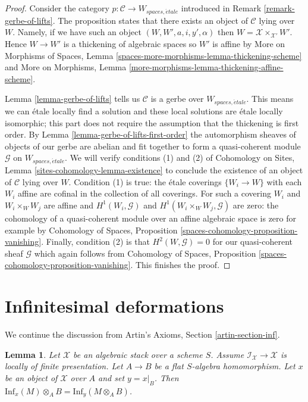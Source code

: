 \documentclass{stacks-project}
\theoremstyle{plain}
\newtheorem{lemma}[subsection]{Lemma}
\theoremstyle{definition}
\theoremstyle{remark}
\numberwithin{equation}{subsection}
\def\etale{{\acute{e}tale}}
\begin{document}
\begin{proof}
Consider the category $p : \mathcal{C} \to W_{spaces, \etale}$
introduced in Remark \ref{remark-gerbe-of-lifts}.
The proposition states that there exists an object of $\mathcal{C}$
lying over $W$. Namely, if we have such an object
$(W, W', a, i, y', \alpha)$ then $W = \mathcal{X} \times_{\mathcal{X}'} W'$.
Hence $W \to W'$ is a thickening of algebraic spaces so
$W'$ is affine by
More on Morphisms of Spaces, Lemma
\ref{spaces-more-morphisms-lemma-thickening-scheme}
and More on Morphisms, Lemma
\ref{more-morphisms-lemma-thickening-affine-scheme}.

\medskip\noindent
Lemma \ref{lemma-gerbe-of-lifts} tells us $\mathcal{C}$ is a gerbe over
$W_{spaces, \etale}$. This means we can \'etale locally find a solution and
these local solutions are \'etale locally isomorphic;
this part does not require the assumption that the thickening is first order.
By Lemma \ref{lemma-gerbe-of-lifts-first-order}
the automorphism sheaves of objects of our gerbe are abelian and
fit together to form a quasi-coherent module $\mathcal{G}$
on $W_{spaces, \etale}$. We will verify conditions (1) and (2)
of Cohomology on Sites, Lemma \ref{sites-cohomology-lemma-existence}
to conclude the existence of an object of $\mathcal{C}$ lying over $W$.
Condition (1) is true: the \'etale coverings $\{W_i \to W\}$
with each $W_i$ affine are cofinal in the collection of all coverings.
For such a covering $W_i$ and $W_i \times_W W_j$ are affine
and $H^1(W_i, \mathcal{G})$ and $H^1(W_i \times_W W_j, \mathcal{G})$
are zero: the cohomology of a quasi-coherent module over an affine
algebraic space is zero for example by Cohomology of Spaces, Proposition
\ref{spaces-cohomology-proposition-vanishing}.
Finally, condition (2) is that $H^2(W, \mathcal{G}) = 0$
for our quasi-coherent sheaf $\mathcal{G}$ which again follows
from Cohomology of Spaces, Proposition
\ref{spaces-cohomology-proposition-vanishing}.
This finishes the proof.
\end{proof}






\section{Infinitesimal deformations}
\label{section-inf}

\noindent
We continue the discussion from
Artin's Axioms, Section \ref{artin-section-inf}.

\begin{lemma}
\label{lemma-inf-quasi-coherent}
Let $\mathcal{X}$ be an algebraic stack over a scheme $S$.
Assume $\mathcal{I}_\mathcal{X} \to \mathcal{X}$ is locally
of finite presentation. Let $A \to B$ be a flat $S$-algebra homomorphism.
Let $x$ be an object of $\mathcal{X}$ over $A$ and set $y = x|_B$.
Then $\text{Inf}_x(M) \otimes_A B = \text{Inf}_y(M \otimes_A B)$.
\end{lemma}
\end{document}
